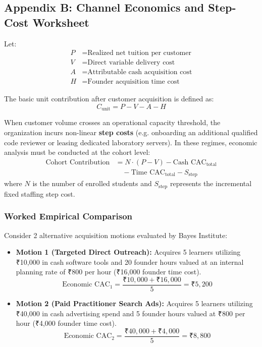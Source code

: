 \subsection*{Appendix B: Channel Economics and Step-Cost Worksheet}

Let:
\begin{align*}
  P &= \text{Realized net tuition per customer} \\
  V &= \text{Direct variable delivery cost} \\
  A &= \text{Attributable cash acquisition cost} \\
  H &= \text{Founder acquisition time cost}
\end{align*}

The basic unit contribution after customer acquisition is defined as:
\begin{equation}
  C_{\text{unit}} = P - V - A - H
\end{equation}

When customer volume crosses an operational capacity threshold, the organization incurs non-linear \textbf{step costs} (e.g. onboarding an additional qualified code reviewer or leasing dedicated laboratory servers). In these regimes, economic analysis must be conducted at the cohort level:
\begin{equation}
  \begin{aligned}
    \text{Cohort Contribution} &= N \cdot (P - V) - \text{Cash CAC}_{\text{total}} \\
    &\quad - \text{Time CAC}_{\text{total}} - S_{\text{step}}
  \end{aligned}
\end{equation}
where $N$ is the number of enrolled students and $S_{\text{step}}$ represents the incremental fixed staffing step cost.

\subsubsection*{Worked Empirical Comparison}
Consider 2 alternative acquisition motions evaluated by Bayes Institute:
\begin{itemize}[leftmargin=*,itemsep=1pt]
  \item \textbf{Motion 1 (Targeted Direct Outreach):} Acquires 5 learners utilizing ₹10,000 in cash software tools and 20 founder hours valued at an internal planning rate of ₹800 per hour (₹16,000 founder time cost).
  \begin{equation*}
    \text{Economic CAC}_1 = \frac{\text{₹}10,000 + \text{₹}16,000}{5} = \text{₹}5,200
  \end{equation*}
  \item \textbf{Motion 2 (Paid Practitioner Search Ads):} Acquires 5 learners utilizing ₹40,000 in cash advertising spend and 5 founder hours valued at ₹800 per hour (₹4,000 founder time cost).
  \begin{equation*}
    \text{Economic CAC}_2 = \frac{\text{₹}40,000 + \text{₹}4,000}{5} = \text{₹}8,800
  \end{equation*}
\end{itemize}

